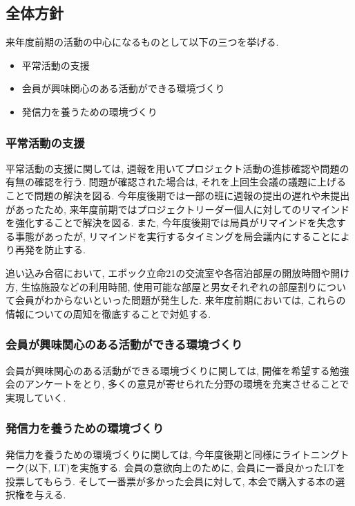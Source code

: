 \subsection*{全体方針}

来年度前期の活動の中心になるものとして以下の三つを挙げる. 
\begin{itemize}
\item 平常活動の支援
\item 会員が興味関心のある活動ができる環境づくり
\item 発信力を養うための環境づくり
\end{itemize}

\subsubsection*{平常活動の支援}
平常活動の支援に関しては, 週報を用いてプロジェクト活動の進捗確認や問題の有無の確認を行う. 
問題が確認された場合は, それを上回生会議の議題に上げることで問題の解決を図る. 
今年度後期では一部の班に週報の提出の遅れや未提出があったため, 
来年度前期ではプロジェクトリーダー個人に対してのリマインドを強化することで解決を図る. 
また, 今年度後期では局員がリマインドを失念する事態があったが, リマインドを実行するタイミングを局会議内にすることにより再発を防止する. 

追い込み合宿において, エポック立命21の交流室や各宿泊部屋の開放時間や開け方, 生協施設などの利用時間, 
使用可能な部屋と男女それぞれの部屋割りについて会員がわからないといった問題が発生した. 
来年度前期においては, これらの情報についての周知を徹底することで対処する. 

\subsubsection*{会員が興味関心のある活動ができる環境づくり}
会員が興味関心のある活動ができる環境づくりに関しては, 開催を希望する勉強会のアンケートをとり, 
多くの意見が寄せられた分野の環境を充実させることで実現していく. 

\subsubsection*{発信力を養うための環境づくり}
発信力を養うための環境づくりに関しては, 今年度後期と同様にライトニングトーク(以下, LT)を実施する. 
会員の意欲向上のために, 会員に一番良かったLTを投票してもらう. 
そして一番票が多かった会員に対して, 本会で購入する本の選択権を与える. 
